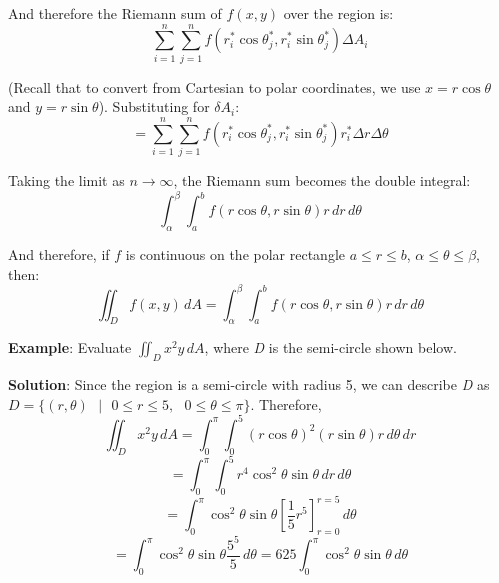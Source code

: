 And therefore the Riemann sum of $f(x,y)$ over the region is:
$$\sum_{i = 1}^n \sum_{j = 1}^n f(r_i^* \cos{\theta_j^*}, r_i^* \sin{\theta_j^*
}) \Delta A_i$$

(Recall that to convert from Cartesian to polar coordinates, we use $x = r\cos{
\theta}$ and $y = r\sin{\theta}$). Substituting for $\delta A_i$:
$$= \sum_{i = 1}^n \sum_{j = 1}^n f(r_i^* \cos{\theta_j^*}, r_i^* \sin{\theta_j
^*}) r_i^* \Delta r \Delta \theta$$

Taking the limit as $n \to \infty$, the Riemann sum becomes the double integral:
$$\int_{\alpha}^{\beta} \int_a^b f(r\cos{\theta}, r\sin{\theta}) r\,dr\,d
\theta$$

And therefore, if $f$ is continuous on the polar rectangle $a \leq r \leq b$, 
$\alpha \leq \theta \leq \beta$, then:
$$\iint_{\textit{D}} f(x,y)\,dA = \int_{\alpha}^{\beta} \int_a^b f(r\cos{\theta
}, r\sin{\theta})r\,dr\,d\theta$$

\textbf{Example}: Evaluate $\iint_{\textit{D}} x^2y\,dA$, where \textit{D} is 
the semi-circle shown below. 

\begin{center}
\end{center}

\textbf{Solution}: Since the region is a semi-circle with radius 5, we can 
describe \textit{D} as $\textit{D} = \{(r, \theta)\text{ }|\text{ }0 \leq r 
\leq 5,\text{ }0 \leq \theta \leq \pi\}$. Therefore, 
$$\iint_{\textit{D}} x^2y\,dA = \int_0^{\pi} \int_0^5 \left(r\cos{\theta} 
\right)^2 \left(r \sin{\theta}\right) r\,d\theta\,dr$$
$$= \int_0^{\pi} \int_0^5 r^4 \cos^2{\theta} \sin{\theta}\,dr\,d\theta$$
$$= \int_0^{\pi} \cos^2{\theta} \sin{\theta} \left[ \frac{1}{5}r^5 \right]_{r 
= 0}^{r = 5}\,d\theta$$
$$=\int_0^{\pi} \cos^2{\theta} \sin{\theta} \frac{5^5}{5}\,d\theta = 625 \int_0
^{\pi} \cos^2{\theta}\sin{\theta}\,d\theta$$

